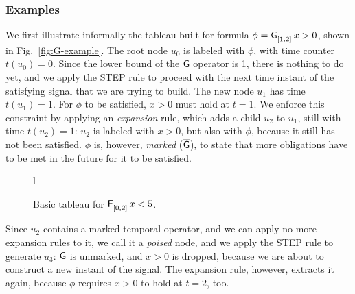 \documentclass[acmsmall,screen]{acmart}
\begin{document}
\subsubsection{Examples}
We first illustrate informally the tableau built for formula $\phi = \mathop{\mathsf{\mathsf{G}}^{{}}_{[1,2]}} x > 0$,
shown in Fig.~\ref{fig:G-example}.
The root node $u_0$ is labeled with $\phi$, with time counter $t(u_0) = 0$.
Since the lower bound of the $\mathsf{G}$ operator is 1,
there is nothing to do yet, and we apply the \textsf{STEP} rule to proceed with
the next time instant of the satisfying signal that we are trying to build.
The new node $u_1$ has time $t(u_1) = 1$.
For $\phi$ to be satisfied, $x > 0$ must hold at $t = 1$.
We enforce this constraint by applying an \emph{expansion} rule,
which adds a child $u_2$ to $u_1$, still with time $t(u_2) = 1$:
$u_2$ is labeled with $x > 0$, but also with $\phi$, because it still has not been satisfied.
$\phi$ is, however, \emph{marked} ($\overline{\mathsf{G}}$),
to state that more obligations have to be met in the future for it to be satisfied.

\begin{figure}[17]{l}
\footnotesize
{}
\caption{Basic tableau for $\mathop{\mathsf{\mathsf{F}}^{{}}_{[0,2]}} x < 5$.}
\label{fig:F-example}
\end{figure}
Since $u_2$ contains a marked temporal operator, and we can apply no more expansion rules to it,
we call it a \emph{poised} node, and we apply the \textsf{STEP} rule to generate $u_3$:
$\mathsf{G}$ is unmarked, and $x > 0$ is dropped, because we are about to construct a new instant of the signal.
The expansion rule, however, extracts it again, because $\phi$ requires $x > 0$ to hold at $t = 2$, too.
\end{document}
